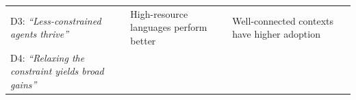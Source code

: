 \begin{table}[t]
{\begin{tabular}{@{}p{}p{}p{}p{}@{}}
            D3: \textit{``Less-constrained agents thrive''}
             & High-resource languages perform better
             & Well-connected contexts have higher adoption
             &                                                                                                                                                                                                                                                                                                                               \\
            D4: \textit{``Relaxing the constraint yields broad gains''}

\end{tabular}}
\end{table}
